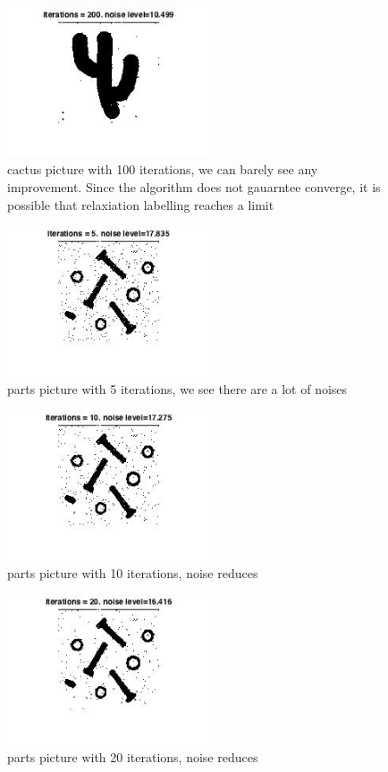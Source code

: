 \documentclass[twoside]{article}
\theoremstyle{definition}
\theoremstyle{definition}
\theoremstyle{remark}
\begin{document}
\begin{figure}[H]
\centering
\includegraphics[width=60mm]{200_cactus.jpg}
\caption{cactus picture with 100 iterations, we can barely see any improvement. Since the algorithm does not gauarntee converge, it is possible that relaxiation labelling reaches a limit}
\end{figure}

\begin{figure}[H]
\centering
\includegraphics[width=60mm]{5_parts.jpg}
\caption{ parts picture with 5 iterations, we see there are a lot of noises}
\end{figure}

\begin{figure}[H]
\centering
\includegraphics[width=60mm]{10_parts.jpg}
\caption{parts picture with 10 iterations, noise reduces}
\end{figure}

\begin{figure}[H]
\centering
\includegraphics[width=60mm]{20_parts.jpg}
\caption{parts  picture with 20 iterations, noise reduces}
\end{figure}
\end{document}

